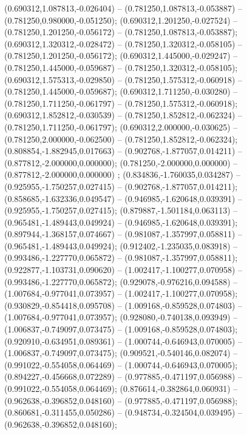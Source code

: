  (0.690312,1.087813,-0.026404) -- (0.781250,1.087813,-0.053887) -- (0.781250,0.980000,-0.051250);
 (0.690312,1.201250,-0.027524) -- (0.781250,1.201250,-0.056172) -- (0.781250,1.087813,-0.053887);
 (0.690312,1.320312,-0.028472) -- (0.781250,1.320312,-0.058105) -- (0.781250,1.201250,-0.056172);
 (0.690312,1.445000,-0.029247) -- (0.781250,1.445000,-0.059687) -- (0.781250,1.320312,-0.058105);
 (0.690312,1.575313,-0.029850) -- (0.781250,1.575312,-0.060918) -- (0.781250,1.445000,-0.059687);
 (0.690312,1.711250,-0.030280) -- (0.781250,1.711250,-0.061797) -- (0.781250,1.575312,-0.060918);
 (0.690312,1.852812,-0.030539) -- (0.781250,1.852812,-0.062324) -- (0.781250,1.711250,-0.061797);
 (0.690312,2.000000,-0.030625) -- (0.781250,2.000000,-0.062500) -- (0.781250,1.852812,-0.062324);
 (0.808854,-1.882945,0.017663) -- (0.902768,-1.877057,0.014211) -- (0.877812,-2.000000,0.000000);
 (0.781250,-2.000000,0.000000) -- (0.877812,-2.000000,0.000000) ;
 (0.834836,-1.760035,0.034287) -- (0.925955,-1.750257,0.027415) -- (0.902768,-1.877057,0.014211);
 (0.858685,-1.632336,0.049547) -- (0.946985,-1.620648,0.039391) -- (0.925955,-1.750257,0.027415);
 (0.879887,-1.501184,0.063113) -- (0.965481,-1.489443,0.049924) -- (0.946985,-1.620648,0.039391);
 (0.897944,-1.368157,0.074667) -- (0.981087,-1.357997,0.058811) -- (0.965481,-1.489443,0.049924);
 (0.912402,-1.235035,0.083918) -- (0.993486,-1.227770,0.065872) -- (0.981087,-1.357997,0.058811);
 (0.922877,-1.103731,0.090620) -- (1.002417,-1.100277,0.070958) -- (0.993486,-1.227770,0.065872);
 (0.929078,-0.976216,0.094588) -- (1.007684,-0.977041,0.073957) -- (1.002417,-1.100277,0.070958);
 (0.930829,-0.854418,0.095708) -- (1.009168,-0.859528,0.074803) -- (1.007684,-0.977041,0.073957);
 (0.928080,-0.740138,0.093949) -- (1.006837,-0.749097,0.073475) -- (1.009168,-0.859528,0.074803);
 (0.920910,-0.634951,0.089361) -- (1.000744,-0.646943,0.070005) -- (1.006837,-0.749097,0.073475);
 (0.909521,-0.540146,0.082074) -- (0.991022,-0.554058,0.064469) -- (1.000744,-0.646943,0.070005);
 (0.894227,-0.456668,0.072289) -- (0.977885,-0.471197,0.056988) -- (0.991022,-0.554058,0.064469);
 (0.876614,-0.382864,0.060931) -- (0.962638,-0.396852,0.048160) -- (0.977885,-0.471197,0.056988);
 (0.860681,-0.311455,0.050286) -- (0.948734,-0.324504,0.039495) -- (0.962638,-0.396852,0.048160);
